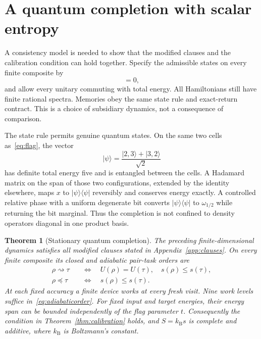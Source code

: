 \documentclass[11pt,a4paper]{article}
\newtheorem{theorem}{Theorem}
\newcommand{\ket}[1]{\lvert #1\rangle}
\newcommand{\bra}[1]{\langle #1\rvert}
\newcommand{\proj}[1]{\ket{#1}\bra{#1}}
\begin{document}
\section{A quantum completion with scalar entropy}\label{sec:completion}
A consistency model is needed to show that the modified clauses and the calibration condition can hold together. Specify the admissible states on every finite composite by
\begin{equation}
 [\rho,H_M]=0, \label{eq:stationary}
\end{equation}
and allow every unitary commuting with total energy. All Hamiltonians still have finite rational spectra. Memories obey the same state rule and exact-return contract. This is a choice of subsidiary dynamics, not a consequence of comparison.

The state rule permits genuine quantum states. On the same two cells as~\eqref{eq:flag}, the vector
\begin{equation}
 \ket{\psi}=\frac{\ket{2,3}+\ket{3,2}}{\sqrt2} \label{eq:entangled}
\end{equation}
has definite total energy five and is entangled between the cells. A Hadamard matrix on the span of those two configurations, extended by the identity elsewhere, maps $x$ to $\proj{\psi}$ reversibly and conserves energy exactly. A controlled relative phase with a uniform degenerate bit converts $\proj{\psi}$ to $\omega_{1/2}$ while returning the bit marginal. Thus the completion is not confined to density operators diagonal in one product basis.

\begin{theorem}[Stationary quantum completion]\label{thm:completion}
The preceding finite-dimensional dynamics satisfies all modified clauses stated in Appendix~\ref{app:clauses}. On every finite composite its closed and adiabatic pair-task orders are
\begin{align}
 \rho\rightsquigarrow\tau
 &\quad\Longleftrightarrow\quad U(\rho)=U(\tau),\quad s(\rho)\le s(\tau), \label{eq:closedorder}\\
 \rho\preceq\tau
 &\quad\Longleftrightarrow\quad s(\rho)\le s(\tau). \label{eq:adiabaticorder}
\end{align}
At each fixed accuracy a finite device works at every fresh visit. Nine work levels suffice in~\eqref{eq:adiabaticorder}. For fixed input and target energies, their energy span can be bounded independently of the flag parameter $t$. Consequently the condition in Theorem~\ref{thm:calibration} holds, and $S=k_{\mathrm B}s$ is complete and additive, where $k_{\mathrm B}$ is Boltzmann's constant.
\end{theorem}
\end{document}
